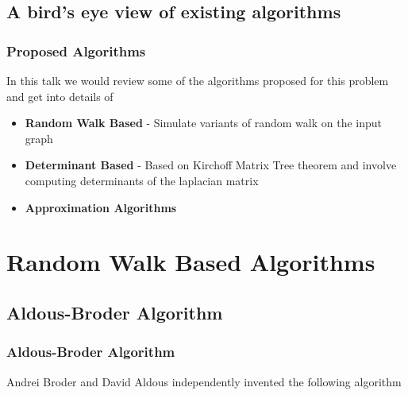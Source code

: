 \documentclass{beamer}
\begin{document}
\subsection{A bird's eye view of existing algorithms}
\begin{frame}
 \frametitle{Proposed Algorithms}
 
 In this talk we would review some of the algorithms proposed for this problem and get into details of \cite{harvey2016generating}  
 
 \leavevmode\hphantom{ }
 
 \begin{itemize}
 \pause
  \item \textbf{Random Walk Based} - Simulate variants of random walk on the input graph
  \pause
  \item \textbf{Determinant Based} - Based on Kirchoff Matrix Tree theorem and involve computing determinants of the laplacian matrix
  \pause
  \item  \textbf{Approximation Algorithms}
 \end{itemize}

 
 
\end{frame}

\section{Random Walk Based Algorithms}

\subsection{Aldous-Broder Algorithm}

\begin{frame}
\frametitle{Aldous-Broder Algorithm}

 Andrei Broder and David Aldous independently invented the following algorithm
 
 

\begin{figure}
{}
\end{figure} 
\end{frame}
\end{document}
